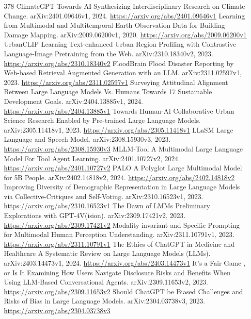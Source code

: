 \documentclass[11pt]{article}
\begin{document}
\begin{thebibliography}{378}
 ClimateGPT Towards AI Synthesizing Interdisciplinary Research on Climate Change. arXiv:2401.09646v1, 2024. \url{https://arxiv.org/abs/2401.09646v1}
 Learning from Multimodal and Multitemporal Earth Observation Data for Building Damage Mapping. arXiv:2009.06200v1, 2020. \url{https://arxiv.org/abs/2009.06200v1}
 UrbanCLIP Learning Text-enhanced Urban Region Profiling with Contrastive Language-Image Pretraining from the Web. arXiv:2310.18340v2, 2023. \url{https://arxiv.org/abs/2310.18340v2}
 FloodBrain Flood Disaster Reporting by Web-based Retrieval Augmented Generation with an LLM. arXiv:2311.02597v1, 2023. \url{https://arxiv.org/abs/2311.02597v1}
 Surveying Attitudinal Alignment Between Large Language Models Vs. Humans Towards 17 Sustainable Development Goals. arXiv:2404.13885v1, 2024. \url{https://arxiv.org/abs/2404.13885v1}
 Towards Human-AI Collaborative Urban Science Research Enabled by Pre-trained Large Language Models. arXiv:2305.11418v1, 2023. \url{https://arxiv.org/abs/2305.11418v1}
 LLaSM Large Language and Speech Model. arXiv:2308.15930v3, 2023. \url{https://arxiv.org/abs/2308.15930v3}
 MLLM-Tool A Multimodal Large Language Model For Tool Agent Learning. arXiv:2401.10727v2, 2024. \url{https://arxiv.org/abs/2401.10727v2}
 PALO A Polyglot Large Multimodal Model for 5B People. arXiv:2402.14818v2, 2024. \url{https://arxiv.org/abs/2402.14818v2}
 Improving Diversity of Demographic Representation in Large Language Models via Collective-Critiques and Self-Voting. arXiv:2310.16523v1, 2023. \url{https://arxiv.org/abs/2310.16523v1}
 The Dawn of LMMs Preliminary Explorations with GPT-4V(ision). arXiv:2309.17421v2, 2023. \url{https://arxiv.org/abs/2309.17421v2}
 Modality-invariant and Specific Prompting for Multimodal Human Perception Understanding. arXiv:2311.10791v1, 2023. \url{https://arxiv.org/abs/2311.10791v1}
 The Ethics of ChatGPT in Medicine and Healthcare A Systematic Review on Large Language Models (LLMs). arXiv:2403.14473v1, 2024. \url{https://arxiv.org/abs/2403.14473v1}
 It's a Fair Game , or Is It Examining How Users Navigate Disclosure Risks and Benefits When Using LLM-Based Conversational Agents. arXiv:2309.11653v2, 2023. \url{https://arxiv.org/abs/2309.11653v2}
 Should ChatGPT be Biased Challenges and Risks of Bias in Large Language Models. arXiv:2304.03738v3, 2023. \url{https://arxiv.org/abs/2304.03738v3}

\end{thebibliography}
\end{document}
